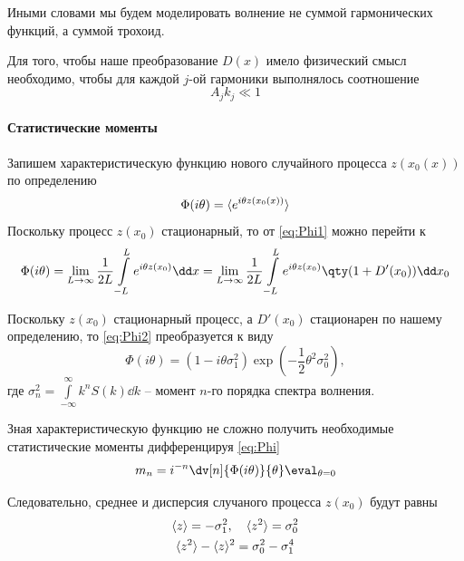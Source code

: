 Иными словами мы будем моделировать волнение не суммой гармонических функций, а 
суммой трохоид. 

Для того, чтобы наше преобразование $D(x)$ имело физический смысл
необходимо, чтобы для каждой $j$-ой гармоники выполнялось соотношение 
\begin{equation}
    A_j k_j \ll 1 
\end{equation}

\paragraph{Статистические моменты}%

Запишем характеристическую функцию нового случайного процесса $z(x_0(x))$ по
определению
 \begin{equation}
    \label{eq:Phi1}
    \Phi(i\theta) = \langle e^{i \theta z(x_0(x))}\rangle
\end{equation}
Поскольку процесс $z(x_0)$ стационарный, то от \eqref{eq:Phi1} можно перейти к
\begin{equation}
    \label{eq:Phi2}
    \Phi(i\theta) = \lim_{L \to \infty} \frac{1}{2L} \int\limits_{-L}^{L} e^{i \theta z(x_0)
    }\dd x = 
    \lim_{L \to \infty} \frac{1}{2L} \int\limits_{-L}^{L} e^{i \theta z(x_0)} \qty( 1 + D'(x_0) ) \dd x_0
\end{equation}

Поскольку $z(x_0)$ стационарный процесс, а  $D'(x_0)$ стационарен по нашему
определению, то  \eqref{eq:Phi2} преобразуется к виду
\begin{equation}
    \label{eq:Phi}
    \Phi(i\theta) = (1 - i \theta \sigma_1^2) 
    \exp(-\frac{1}{2} \theta^2 \sigma_0^2),
\end{equation}
где $\sigma^2_n = \int\limits_{-\infty}^{\infty}  k^n S(k) \dd k$ -- момент
$n$-го порядка спектра волнения.

Зная характеристическую функцию не сложно получить необходимые статистические
моменты дифференцируя \eqref{eq:Phi}
\begin{equation}
    m_n = i^{-n} \dv[n]{\Phi(i\theta)}{\theta} \eval_{\theta = 0}
\end{equation}

Следовательно, среднее и дисперсия случаного процесса $z(x_0)$ будут
равны
\begin{gather}
    \label{eq:}
    \langle z\rangle = - \sigma_1^2, \quad \langle z^2\rangle = \sigma_0^2 \\
    \langle z^2\rangle - \langle z\rangle^2 = \sigma_0^2 - \sigma_1^4
\end{gather}

